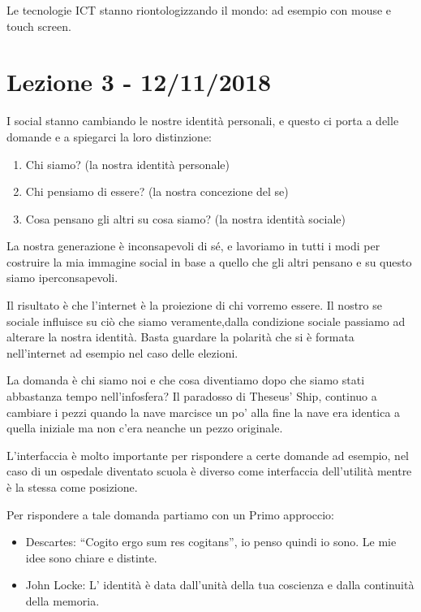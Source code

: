 \documentclass[a4page, 11pt]{article}
\begin{document}
Le tecnologie ICT stanno riontologizzando il mondo: ad esempio con mouse
e touch screen.
\section*{Lezione 3 - 12/11/2018}

I social stanno cambiando le nostre identità personali, e questo ci
porta a delle domande e a spiegarci la loro distinzione:

\begin{enumerate}
	\def\labelenumi{\arabic{enumi}.}
	 
	\item
	Chi siamo? (la nostra identità personale)
	\item
	Chi pensiamo di essere? (la nostra concezione del se)
	\item
	Cosa pensano gli altri su cosa siamo? (la nostra identità sociale)
\end{enumerate}

La nostra generazione è inconsapevoli di sé, e lavoriamo in tutti i modi
per costruire la mia immagine social in base a quello che gli altri
pensano e su questo siamo iperconsapevoli.

Il risultato è che l'internet è la proiezione di chi vorremo essere.
Il nostro se sociale influisce su ciò che siamo veramente,dalla 
condizione sociale passiamo ad alterare la nostra identità.
Basta guardare la polarità che si è formata nell'internet ad esempio nel
caso delle elezioni.

La domanda è chi siamo noi e che cosa diventiamo dopo che siamo stati
abbastanza tempo nell'infosfera? Il paradosso di Theseus' Ship, continuo
a cambiare i pezzi quando la nave marcisce un po' alla fine la nave era
identica a quella iniziale ma non c'era neanche un pezzo originale.

L'interfaccia è molto importante per rispondere a certe domande ad
esempio, nel caso di un ospedale diventato scuola è diverso come
interfaccia dell'utilità mentre è la stessa come posizione.

Per rispondere a tale domanda partiamo con un Primo approccio:

\begin{itemize}
	 
	\item
	Descartes: ``Cogito ergo sum res cogitans'', io penso quindi io sono.
	Le mie idee sono chiare e distinte.
	\item
	John Locke: L' identità è data dall'unità della tua coscienza e dalla
	continuità della memoria.
\end{itemize}
\end{document}
